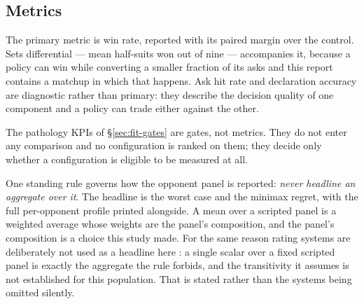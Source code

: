 \subsection{Metrics}
\label{sec:protocol-metrics}

The primary metric is win rate, reported with its paired margin over the control.
Sets differential --- mean half-suits won out of nine --- accompanies it, because
a policy can win while converting a smaller fraction of its asks and this report
contains a matchup in which that happens. Ask hit rate and declaration accuracy
are diagnostic rather than primary: they describe the decision quality of one
component and a policy can trade either against the other.

The pathology KPIs of \S\ref{sec:fit-gates} are gates, not metrics. They do not
enter any comparison and no configuration is ranked on them; they decide only
whether a configuration is eligible to be measured at all.

One standing rule governs how the opponent panel is reported: \emph{never
headline an aggregate over it}. The headline is the worst case and the minimax
regret, with the full per-opponent profile printed alongside. A mean over a
scripted panel is a weighted average whose weights are the panel's composition,
and the panel's composition is a choice this study made. For the same reason
rating systems are deliberately not used as a headline here
\cite{coulom-whr,herbrich-trueskill,nelo,balduzzi-reeval}: a single scalar over a
fixed scripted panel is exactly the aggregate the rule forbids, and the
transitivity it assumes is not established for this population. That is stated
rather than the systems being omitted silently.

